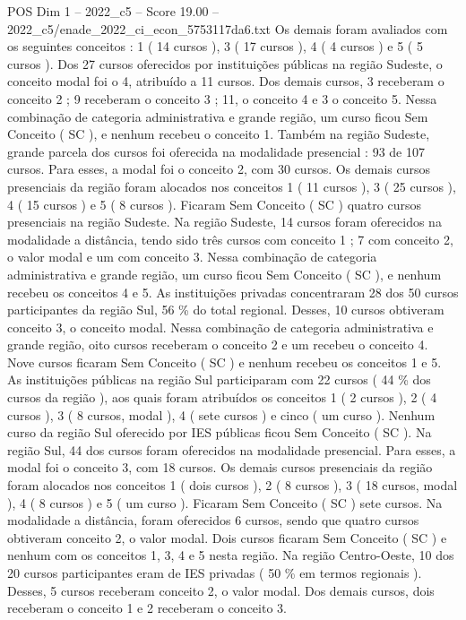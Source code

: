 \begin{textsample}{POS Dim 1 – 2022\_c5 – Score 19.00 – 2022\_c5/enade\_2022\_ci\_econ\_5753117da6.txt}
Os demais foram avaliados com os seguintes conceitos : 1 ( 14 cursos ), 3 ( 17 cursos ), 4 ( 4 cursos ) e 5 ( 5 cursos ).
Dos 27 cursos oferecidos por instituições públicas na região Sudeste, o conceito modal foi o 4, atribuído a 11 cursos.
Dos demais cursos, 3 receberam o conceito 2 ; 9 receberam o conceito 3 ; 11, o conceito 4 e 3 o conceito 5.
Nessa combinação de categoria administrativa e grande região, um curso ficou Sem Conceito ( SC ), e nenhum recebeu o conceito 1.
Também na região Sudeste, grande parcela dos cursos foi oferecida na modalidade presencial : 93 de 107 cursos.
Para esses, a modal foi o conceito 2, com 30 cursos.
Os demais cursos presenciais da região foram alocados nos conceitos 1 ( 11 cursos ), 3 ( 25 cursos ), 4 ( 15 cursos ) e 5 ( 8 cursos ).
Ficaram Sem Conceito ( SC ) quatro cursos presenciais na região Sudeste.
Na região Sudeste, 14 cursos foram oferecidos na modalidade a distância, tendo sido três cursos com conceito 1 ; 7 com conceito 2, o valor modal e um com conceito 3.
Nessa combinação de categoria administrativa e grande região, um curso ficou Sem Conceito ( SC ), e nenhum recebeu os conceitos 4 e 5.
As instituições privadas concentraram 28 dos 50 cursos participantes da região Sul, 56 \% do total regional.
Desses, 10 cursos obtiveram conceito 3, o conceito modal.
Nessa combinação de categoria administrativa e grande região, oito cursos receberam o conceito 2 e um recebeu o conceito 4.
Nove cursos ficaram Sem Conceito ( SC ) e nenhum recebeu os conceitos 1 e 5.
As instituições públicas na região Sul participaram com 22 cursos ( 44 \% dos cursos da região ), aos quais foram atribuídos os conceitos 1 ( 2 cursos ), 2 ( 4 cursos ), 3 ( 8 cursos, modal ), 4 ( sete cursos ) e cinco ( um curso ).
Nenhum curso da região Sul oferecido por IES públicas ficou Sem Conceito ( SC ).
Na região Sul, 44 dos cursos foram oferecidos na modalidade presencial.
Para esses, a modal foi o conceito 3, com 18 cursos.
Os demais cursos presenciais da região foram alocados nos conceitos 1 ( dois cursos ), 2 ( 8 cursos ), 3 ( 18 cursos, modal ), 4 ( 8 cursos ) e 5 ( um curso ).
Ficaram Sem Conceito ( SC ) sete cursos.
Na modalidade a distância, foram oferecidos 6 cursos, sendo que quatro cursos obtiveram conceito 2, o valor modal.
Dois cursos ficaram Sem Conceito ( SC ) e nenhum com os conceitos 1, 3, 4 e 5 nesta região.
Na região Centro-Oeste, 10 dos 20 cursos participantes eram de IES privadas ( 50 \% em termos regionais ).
Desses, 5 cursos receberam conceito 2, o valor modal.
Dos demais cursos, dois receberam o conceito 1 e 2 receberam o conceito 3.

\end{textsample}
